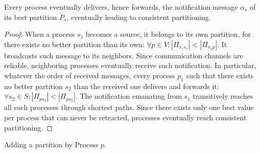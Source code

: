 
\begin{theorem}
  Every process eventually delivers, hence forwards, the notification
  message $\alpha_s$ of its best partition $P_s$, eventually leading
  to consistent partitioning.
\end{theorem}

\begin{proof} When a process $s_1$ becomes a source, it belongs to
its own partition, for there exists no better partition than its own:
$\forall p \in V: |\Pi_{s_1 s_1}| < |\Pi_{s_1 p}|$. It broadcasts such
message to its neighbors. Since communication channels are reliable,
neighboring processes eventually receive such notification. In
particular, whatever the order of received messages, every process
$p_1$ such that there exists no better partition $s_2$ than the
received one delivers and forwards it: $\forall s_2 \in S: |\Pi_{p
  s_1}| < |\Pi_{p s_2}|$. The notification emanating from $s_1$
transitively reaches all such processes through shortest paths. Since
there exists only one best value per process that can never be
retracted, processes eventually reach consistent partitioning.
\end{proof}



\begin{algorithm}
  
  \caption{\label{algo:add}Adding a partition by Process $p$.}
\end{algorithm}


